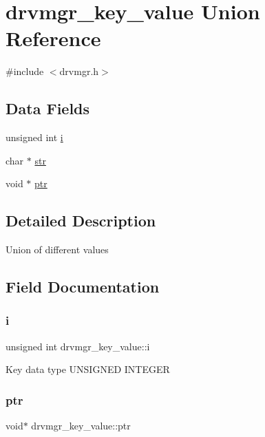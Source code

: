 \hypertarget{uniondrvmgr__key__value}{}\section{drvmgr\+\_\+key\+\_\+value Union Reference}
\label{uniondrvmgr__key__value}


{\ttfamily \#include $<$drvmgr.\+h$>$}

\subsection*{Data Fields}
\begin{DoxyCompactItemize}
\item 
unsigned int \mbox{\hyperlink{uniondrvmgr__key__value_a428feafb23a4c4e182f90c5af447ad90}{i}}
\item 
char $\ast$ \mbox{\hyperlink{uniondrvmgr__key__value_a57c138322a3ff8824f70c1973c3561e9}{str}}
\item 
void $\ast$ \mbox{\hyperlink{uniondrvmgr__key__value_ad628f568bfa4e441eb5819b1c824c099}{ptr}}
\end{DoxyCompactItemize}


\subsection{Detailed Description}
Union of different values 

\subsection{Field Documentation}
\mbox{\label{uniondrvmgr__key__value_a428feafb23a4c4e182f90c5af447ad90}} 
\subsubsection{\texorpdfstring{i}{i}}
{\footnotesize\ttfamily unsigned int drvmgr\+\_\+key\+\_\+value\+::i}

Key data type U\+N\+S\+I\+G\+N\+ED I\+N\+T\+E\+G\+ER \mbox{\label{uniondrvmgr__key__value_ad628f568bfa4e441eb5819b1c824c099}} 
\subsubsection{\texorpdfstring{ptr}{ptr}}
{\footnotesize\ttfamily void$\ast$ drvmgr\+\_\+key\+\_\+value\+::ptr}

